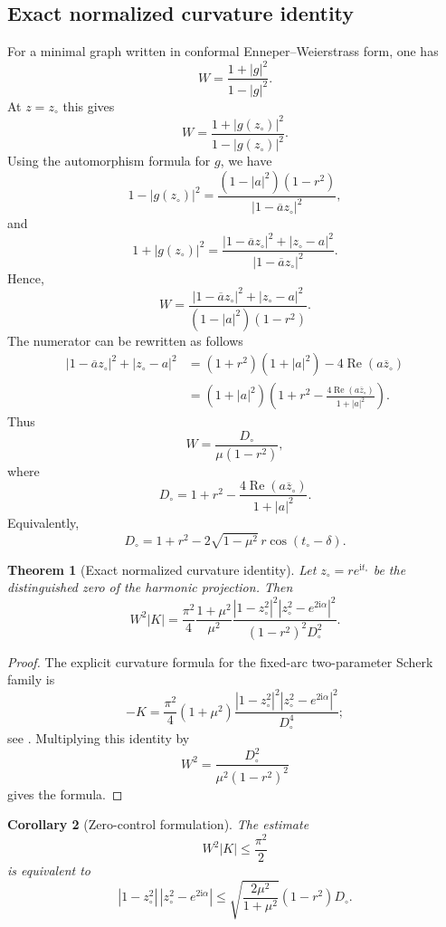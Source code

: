 \documentclass[11pt]{amsart}
\newtheorem{theorem}{Theorem}[section]
\newtheorem{corollary}[theorem]{Corollary}
\theoremstyle{remark}
\newcommand{\ii}{\mathrm i}
\newcommand{\zc}{z_\circ}
\newcommand{\Dc}{D_\circ}
\numberwithin{equation}{section}
\begin{document}
\subsection{Exact normalized curvature identity}

For a minimal graph written in conformal Enneper--Weierstrass form, one has
\[
        W=\frac{1+|g|^2}{1-|g|^2}.
\]
At $z=\zc$ this gives
\[
        W=\frac{1+|g(\zc)|^2}{1-|g(\zc)|^2}.
\]
Using the automorphism formula for $g$, we have
\[
        1-|g(\zc)|^2
        =\frac{(1-|a|^2)(1-r^2)}{|1-\overline a\zc|^2},
\]
and
\[
        1+|g(\zc)|^2
        =\frac{|1-\overline a\zc|^2+|\zc-a|^2}{|1-\overline a\zc|^2}.
\]
Hence,
\[
        W=\frac{|1-\overline a\zc|^2+|\zc-a|^2}{(1-|a|^2)(1-r^2)}.
\]
The numerator can be rewritten as follows
\[
\begin{aligned}
 |1-\overline a\zc|^2+|\zc-a|^2
 &= (1+r^2)(1+|a|^2)-4\operatorname{Re}(a\overline\zc)  \\
 &= (1+|a|^2)\left(1+r^2-\frac{4\operatorname{Re}(a\overline\zc)}{1+|a|^2}\right).
\end{aligned}
\]
Thus
\[
        W=\frac{\Dc}{\mu(1-r^2)},
\]
where
\[
        \Dc=1+r^2-\frac{4\operatorname{Re}(a\overline\zc)}{1+|a|^2}.
\]
Equivalently,
\[
        \Dc=1+r^2-2\sqrt{1-\mu^2}\, r\cos(t_\circ-\delta).
\]

\begin{theorem}[Exact normalized curvature identity]\label{thm:exact}
Let $\zc=re^{\ii t_\circ}$ be the distinguished zero of the harmonic projection.  Then
\[
        W^2|K|
        =\frac{\pi^2}{4}\frac{1+
        \mu^2}{\mu^2}
        \frac{|1-\zc^2|^2|\zc^2-e^{2\ii\alpha}|^2}{(1-r^2)^2\Dc^2}.
\]
\end{theorem}

\begin{proof}
The explicit curvature formula for the fixed-arc two-parameter Scherk family is
\[
        -K
        =\frac{\pi^2}{4}(1+\mu^2)
        \frac{|1-\zc^2|^2|\zc^2-e^{2\ii\alpha}|^2}{\Dc^4};
\]
see \cite[Eq. (4.2)]{KalajMelentijevic2026}.  Multiplying this identity by
\[
        W^2=\frac{\Dc^2}{\mu^2(1-r^2)^2}
\]
gives the formula.
\end{proof}

\begin{corollary}[Zero-control formulation]\label{cor:zero-control}
The estimate
\[
        W^2|K|\leq \frac{\pi^2}{2}
\]
is equivalent to
\[
        |1-\zc^2|\,|\zc^2-e^{2\ii\alpha}|
        \leq
        \sqrt{\frac{2\mu^2}{1+\mu^2}}
        (1-r^2)\Dc.
\]
\end{corollary}
\end{document}
